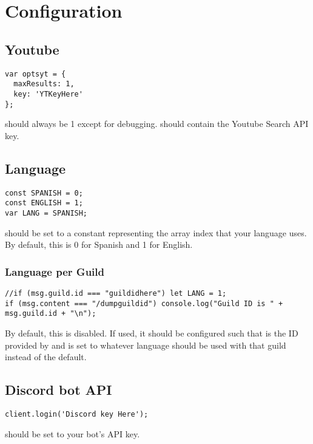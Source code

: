 \documentclass{article}
\begin{document}
\section{Configuration}
\subsection{Youtube}
\begin{lstlisting}[frame=single,inputencoding=utf8,showstringspaces=false]
var optsyt = {
  maxResults: 1,
  key: 'YTKeyHere'
};
\end{lstlisting}
 should always be 1 except for debugging.\newline
{} should contain the Youtube Search API key.\par
\subsection{Language}
\begin{lstlisting}[frame=single,inputencoding=utf8,showstringspaces=false]
const SPANISH = 0;
const ENGLISH = 1;
var LANG = SPANISH;
\end{lstlisting}
 should be set to a constant representing the array index that your language uses. By default, this is 0 for Spanish and 1 for English.\par
\subsubsection{Language per Guild}
\begin{lstlisting}[frame=single,inputencoding=utf8,showstringspaces=false,linewidth=18.3cm]
//if (msg.guild.id === "guildidhere") let LANG = 1;
if (msg.content === "/dumpguildid") console.log("Guild ID is " + msg.guild.id + "\n");
\end{lstlisting}
By default, this is disabled. If used, it should be configured such that  is the ID provided by  and  is set to whatever language should be used with that guild instead of the default.\par
\subsection{Discord bot API}
\begin{lstlisting}[frame=single,inputencoding=utf8,showstringspaces=false]
client.login('Discord key Here');
\end{lstlisting}
 should be set to your bot's API key.
\end{document}
